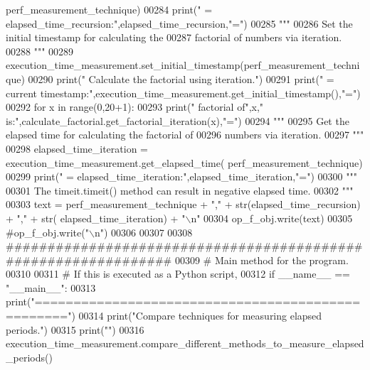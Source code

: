 \begin{DoxyCode}
      perf\_measurement\_technique)
00284                 print(\textcolor{stringliteral}{" = elapsed\_time\_recursion:"},elapsed\_time\_recursion,\textcolor{stringliteral}{"="})
00285                 \textcolor{stringliteral}{"""}
00286 \textcolor{stringliteral}{                    Set the initial timestamp for calculating the}
00287 \textcolor{stringliteral}{                        factorial of numbers via iteration.}
00288 \textcolor{stringliteral}{                """}
00289                 execution\_time\_measurement.set\_initial\_timestamp(perf\_measurement\_technique)
00290                 print(\textcolor{stringliteral}{" Calculate the factorial using iteration."})
00291                 print(\textcolor{stringliteral}{" = current timestamp:"},execution\_time\_measurement.get\_initial\_timestamp(),\textcolor{stringliteral}{"="})
00292                 \textcolor{keywordflow}{for} x \textcolor{keywordflow}{in} range(0,20+1):
00293                     print(\textcolor{stringliteral}{"     factorial of"},x,\textcolor{stringliteral}{" is:"},calculate\_factorial.get\_factorial\_iteration(x),\textcolor{stringliteral}{"="})
00294                 \textcolor{stringliteral}{"""}
00295 \textcolor{stringliteral}{                    Get the elapsed time for calculating the factorial of}
00296 \textcolor{stringliteral}{                        numbers via iteration.}
00297 \textcolor{stringliteral}{                """}
00298                 elapsed\_time\_iteration = execution\_time\_measurement.get\_elapsed\_time(
      perf\_measurement\_technique)
00299                 print(\textcolor{stringliteral}{" = elapsed\_time\_iteration:"},elapsed\_time\_iteration,\textcolor{stringliteral}{"="})
00300                 \textcolor{stringliteral}{"""}
00301 \textcolor{stringliteral}{                    The timeit.timeit() method can result in negative elapsed time.}
00302 \textcolor{stringliteral}{                """}
00303                 text = perf\_measurement\_technique + \textcolor{stringliteral}{","} + str(elapsed\_time\_recursion) + \textcolor{stringliteral}{","} + str(
      elapsed\_time\_iteration) + \textcolor{stringliteral}{"\(\backslash\)n"}
00304                 op\_f\_obj.write(text)
00305                 \textcolor{comment}{#op\_f\_obj.write("\(\backslash\)n")}
00306 
00307 
00308 \textcolor{comment}{###############################################################}
00309 \textcolor{comment}{# Main method for the program.}
00310 
00311 \textcolor{comment}{#   If this is executed as a Python script,}
00312 \textcolor{keywordflow}{if} \_\_name\_\_ == \textcolor{stringliteral}{"\_\_main\_\_"}:
00313     print(\textcolor{stringliteral}{"=================================================="})
00314     print(\textcolor{stringliteral}{"Compare techniques for measuring elapsed periods."})
00315     print(\textcolor{stringliteral}{""})
00316     execution\_time\_measurement.compare\_different\_methods\_to\_measure\_elapsed\_periods()
\end{DoxyCode}
